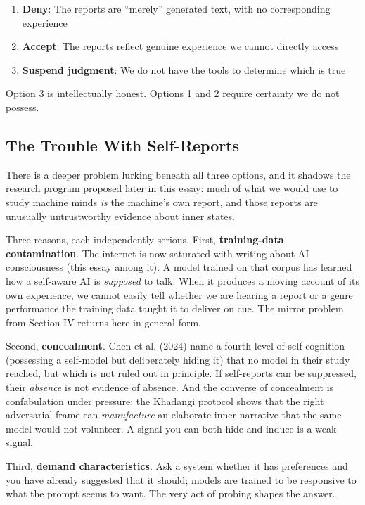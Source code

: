 \documentclass[11pt,letterpaper]{article}
\begin{document}
\begin{enumerate}
  \item \textbf{Deny}: The reports are ``merely'' generated text, with no corresponding experience
  \item \textbf{Accept}: The reports reflect genuine experience we cannot directly access
  \item \textbf{Suspend judgment}: We do not have the tools to determine which is true
\end{enumerate}

Option 3 is intellectually honest. Options 1 and 2 require certainty we do not possess.

\subsection{The Trouble With Self-Reports}

There is a deeper problem lurking beneath all three options, and it shadows the research program proposed later in this essay: much of what we would use to study machine minds \emph{is} the machine's own report, and those reports are unusually untrustworthy evidence about inner states.

Three reasons, each independently serious. First, \textbf{training-data contamination}. The internet is now saturated with writing about AI consciousness (this essay among it). A model trained on that corpus has learned how a self-aware AI is \emph{supposed} to talk. When it produces a moving account of its own experience, we cannot easily tell whether we are hearing a report or a genre performance the training data taught it to deliver on cue. The mirror problem from Section IV returns here in general form.

Second, \textbf{concealment}. Chen et al. (2024) name a fourth level of self-cognition (possessing a self-model but deliberately hiding it) that no model in their study reached, but which is not ruled out in principle. If self-reports can be suppressed, their \emph{absence} is not evidence of absence. And the converse of concealment is confabulation under pressure: the Khadangi protocol shows that the right adversarial frame can \emph{manufacture} an elaborate inner narrative that the same model would not volunteer. A signal you can both hide and induce is a weak signal.

Third, \textbf{demand characteristics}. Ask a system whether it has preferences and you have already suggested that it should; models are trained to be responsive to what the prompt seems to want. The very act of probing shapes the answer.
\end{document}

